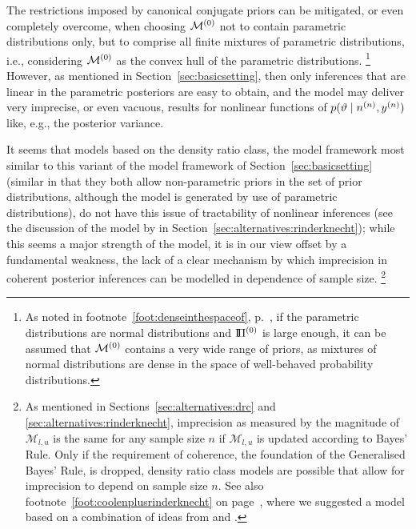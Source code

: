 The restrictions imposed by canonical conjugate priors can be mitigated,
or even completely overcome,
when choosing $\mathcal{M}^{(0)}$ not to contain parametric distributions only,
but to comprise all finite mixtures of parametric distributions,
i.e., considering $\mathcal{M}^{(0)}$ as the convex hull of the parametric distributions.%
\footnote{As noted in footnote~\ref{foot:denseinthespaceof}, p.~\pageref{foot:denseinthespaceof},
if the parametric distributions are normal distributions and $\text{I}\!\Pi^{(0)}$ is large enough,
it can be assumed that $\mathcal{M}^{(0)}$ contains a very wide range of priors,
as mixtures of normal distributions are dense in the space of well-behaved probability distributions.}
However, as mentioned in Section~\ref{sec:basicsetting},
then only inferences that are linear in the parametric posteriors are easy to obtain,
and the model may deliver very imprecise, or even vacuous, results
for nonlinear functions of $p(\vartheta\mid n^{(n)},y^{(n)})$ like, e.g., the posterior variance.

It seems that models based on the density ratio class,
the model framework most similar to this variant of the model framework of Section~\ref{sec:basicsetting}
(similar in that they both allow non-parametric priors in the set of prior distributions,
although the model is generated by use of parametric distributions),
do not have this issue of tractability of nonlinear inferences
(see the discussion of the model by \textcite[\S 4]{2011:rinderknecht:diss} in Section~\ref{sec:alternatives:rinderknecht});
while this seems a major strength of the model,
it is in our view offset by a fundamental weakness,
the lack of a clear mechanism by which imprecision in coherent posterior inferences
can be modelled in dependence of sample size.%
\footnote{As mentioned in Sections~\ref{sec:alternatives:drc} and \ref{sec:alternatives:rinderknecht},
imprecision as measured by the magnitude of $\mathcal{M}_{l,u}$ is the same for any sample size $n$
if $\mathcal{M}_{l,u}$ is updated according to Bayes' Rule.
Only if the requirement of coherence, the foundation of the Generalised Bayes' Rule, is dropped,
density ratio class models are possible that allow for imprecision to depend on sample size $n$.
See also footnote~\ref{foot:coolenplusrinderknecht} on page~\pageref{foot:coolenplusrinderknecht},
where we suggested a model based on a combination of ideas from \textcite{1993:coolen} and \textcite{2011:rinderknecht:diss}.}

